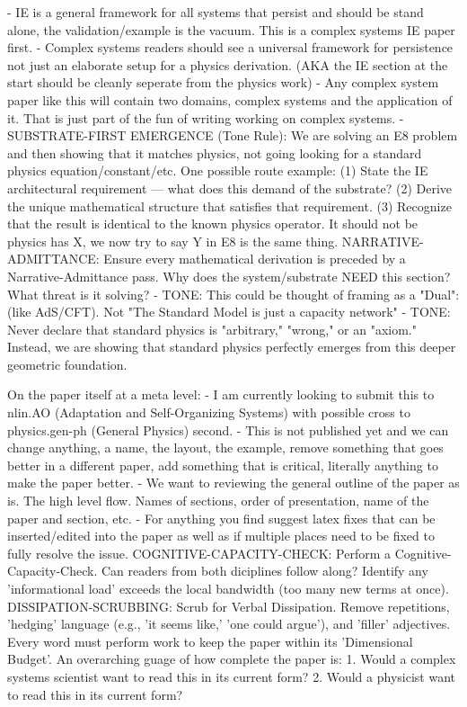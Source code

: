 - IE is a general framework for all systems that persist and should be stand alone, the validation/example is the vacuum. This is a complex systems IE paper first.
- Complex systems readers should see a universal framework for persistence not just an elaborate setup for a physics derivation.  (AKA the IE section at the start should be cleanly seperate from the physics work)
- Any complex system paper like this will contain two domains, complex systems and the application of it.  That is just part of the fun of writing working on complex systems.
- SUBSTRATE-FIRST EMERGENCE (Tone Rule): We are solving an E8 problem and then showing that it matches physics, not going looking for a  standard physics equation/constant/etc.  One possible route example: (1) State the IE architectural requirement — what does this demand of the substrate? (2) Derive the unique mathematical structure that satisfies that requirement. (3) Recognize that the result is identical to the known physics operator. It should not be physics has X, we now try to say Y in E8 is the same thing. 
NARRATIVE-ADMITTANCE: Ensure every mathematical derivation is preceded by a Narrative-Admittance pass. Why does the system/substrate NEED this section? What threat is it solving?
- TONE: This could be thought of framing as a "Dual": (like AdS/CFT). Not "The Standard Model is just a capacity network" 
- TONE: Never declare that standard physics is "arbitrary," "wrong," or an "axiom." Instead, we are showing that standard physics perfectly emerges from this deeper geometric foundation.

On the paper itself at a meta level:
- I am currently looking to submit this to nlin.AO (Adaptation and Self-Organizing Systems) with possible cross to physics.gen-ph (General Physics) second. 
- This is not published yet and we can change anything, a name, the layout, the example, remove something that goes better in a different paper, add something that is critical, literally anything to make the paper better.
- We want to reviewing the general outline of the paper as is.  The high level flow.  Names of sections, order of presentation, name of the paper and section, etc.
- For anything you find suggest latex fixes that can be inserted/edited into the paper as well as if multiple places need to be fixed to fully resolve the issue.
COGNITIVE-CAPACITY-CHECK: Perform a Cognitive-Capacity-Check. Can readers from both diciplines follow along? Identify any 'informational load' exceeds the local bandwidth (too many new terms at once).
DISSIPATION-SCRUBBING: Scrub for Verbal Dissipation. Remove repetitions, 'hedging' language (e.g., 'it seems like,' 'one could argue'), and 'filler' adjectives. Every word must perform work to keep the paper within its 'Dimensional Budget'.
An overarching guage of how complete the paper is: 1. Would a complex systems scientist want to read this in its current form? 2. Would a physicist want to read this in its current form? 


